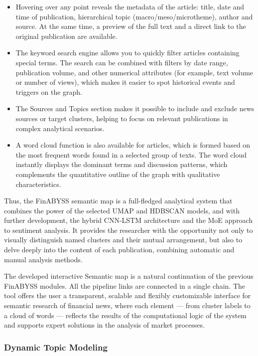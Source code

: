 \begin{itemize}
    \item Hovering over any point reveals the metadata of the article: title, date and time of publication,
    hierarchical topic (macro/meso/microtheme), author and source. At the same time, a preview of the full
    text and a direct link to the original publication are available.
    \item The keyword search engine allows you to quickly filter articles containing special terms. The search
    can be combined with filters by date range, publication volume, and other numerical attributes (for example,
    text volume or number of views), which makes it easier to spot historical events and triggers on the graph.
    \item The Sources and Topics section makes it possible to include and exclude news sources or target clusters,
    helping to focus on relevant publications in complex analytical scenarios.
    \item A word cloud function is also available for articles, which is formed based on the most frequent words
    found in a selected group of texts. The word cloud instantly displays the dominant terms and discussion patterns,
    which complements the quantitative outline of the graph with qualitative characteristics.
\end{itemize}

Thus, the FinABYSS semantic map is a full-fledged analytical system that combines the power of the selected UMAP
and HDBSCAN models, and with further development, the hybrid CNN-LSTM architecture and the MoE approach to sentiment
analysis. It provides the researcher with the opportunity not only to visually distinguish named clusters and
their mutual arrangement, but also to delve deeply into the content of each publication, combining automatic and
manual analysis methods.

The developed interactive Semantic map is a natural continuation of the previous FinABYSS modules. All the pipeline
links are connected in a single chain. The tool offers the user a transparent, scalable and flexibly customizable
interface for semantic research of financial news, where each element --- from cluster labels to a cloud
of words --- reflects the results of the computational logic of the system and supports expert solutions
in the analysis of market processes.

\subsubsection{Dynamic Topic Modeling}

